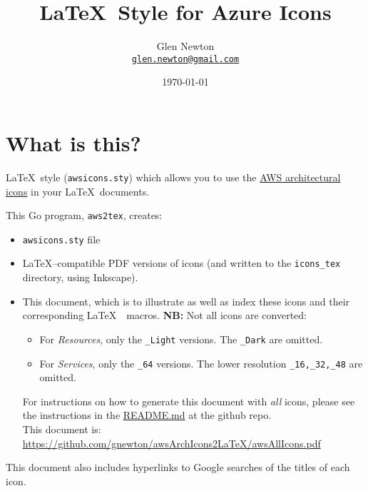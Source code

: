 \documentclass[12pt]{article}
\title{\LaTeX\ Style for Azure Icons}
\author{Glen Newton \\\texttt{\href{mailto:glen.newton@gmail.com}{glen.newton@gmail.com}}}
\date{\today}
\begin{document}
\maketitle
\tableofcontents\label{toc}
\noindent\makebox[\linewidth]{\rule{\paperwidth}{0.4pt}}

\section{What is this?}
\LaTeX\ style (\texttt{awsicons.sty}) which allows you to use the \href{https://aws.amazon.com/architecture/icons/}{AWS architectural icons} in your \LaTeX\  documents.

\vspace{3mm}


\noindent This Go program, \texttt{aws2tex}, creates:
\begin{itemize}
\item \texttt{awsicons.sty} file
\item \LaTeX--compatible PDF versions of icons (and written to the \texttt{icons\_tex} directory, using Inkscape).
\item This document, which is to illustrate as well as index these icons and their corresponding \LaTeX\ \  macros.
  \newline
  \textbf{NB:} Not all icons are converted:
  \begin{itemize}
  \item For \textit{Resources}, only the \texttt{\_Light} versions. The \texttt{\_Dark} are omitted.
  \item For \textit{Services}, only the \texttt{\_64} versions. The lower resolution \texttt{\_16,\_32,\_48} are omitted.
  \end{itemize}
For instructions on how to generate this document with \textit{all} icons, please see the instructions in the \href{https://github.com/gnewton/awsArchIcons2LaTeX}{README.md} at the github repo.\\
This document is: \url{https://github.com/gnewton/awsArchIcons2LaTeX/awsAllIcons.pdf}
\end{itemize}
This document also includes hyperlinks to Google searches of the titles of each icon.
\end{document}
